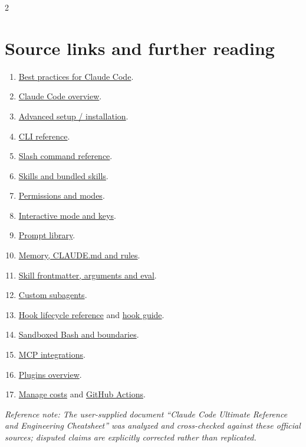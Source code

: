 \documentclass[9pt,a4paper]{extarticle}
\begin{document}
\begin{multicols}{2}
\section{Source links and further reading}
\footnotesize\color{slate}
\begin{enumerate}[leftmargin=13pt,itemsep=2pt]
\item \href{https://code.claude.com/docs/en/best-practices}{Best practices for Claude Code}.
\item \href{https://code.claude.com/docs/en/overview}{Claude Code overview}.
\item \href{https://code.claude.com/docs/en/setup}{Advanced setup / installation}.
\item \href{https://code.claude.com/docs/en/cli-reference}{CLI reference}.
\item \href{https://code.claude.com/docs/en/commands}{Slash command reference}.
\item \href{https://code.claude.com/docs/en/skills}{Skills and bundled skills}.
\item \href{https://code.claude.com/docs/en/permissions}{Permissions and modes}.
\item \href{https://code.claude.com/docs/en/interactive-mode}{Interactive mode and keys}.
\item \href{https://code.claude.com/docs/en/prompt-library}{Prompt library}.
\item \href{https://code.claude.com/docs/en/memory}{Memory, CLAUDE.md and rules}.
\item \href{https://code.claude.com/docs/en/skills}{Skill frontmatter, arguments and eval}.
\item \href{https://code.claude.com/docs/en/sub-agents}{Custom subagents}.
\item \href{https://code.claude.com/docs/en/hooks}{Hook lifecycle reference} and \href{https://code.claude.com/docs/en/hooks-guide}{hook guide}.
\item \href{https://code.claude.com/docs/en/sandboxing}{Sandboxed Bash and boundaries}.
\item \href{https://code.claude.com/docs/en/mcp}{MCP integrations}.
\item \href{https://code.claude.com/docs/en/plugins}{Plugins overview}.
\item \href{https://code.claude.com/docs/en/costs}{Manage costs} and \href{https://code.claude.com/docs/en/github-actions}{GitHub Actions}.
\end{enumerate}
\vspace{4pt}\textit{Reference note: The user-supplied document ``Claude Code Ultimate Reference and Engineering Cheatsheet'' was analyzed and cross-checked against these official sources; disputed claims are explicitly corrected rather than replicated.}\par
\end{multicols}
\end{document}
